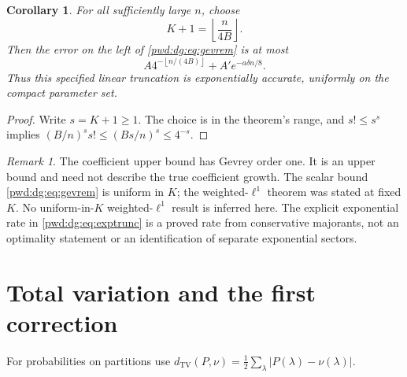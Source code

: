\documentclass[11pt,letterpaper]{article}
\numberwithin{equation}{section}
\newtheorem{corollary}[theorem]{Corollary}
\theoremstyle{remark}\newtheorem{remark}[theorem]{Remark}
\newcommand{\TV}{d_{\mathrm{TV}}}
\newcommand{\floor}[1]{\left\lfloor #1\right\rfloor}
\begin{document}
\begin{corollary}\label{pwd:dg:cor:exptrunc}
For all sufficiently large $n$, choose
\begin{equation}\label{pwd:dg:eq:Klinear}
 K+1=\floor{\frac{n}{4B}}.
\end{equation}
Then the error on the left of \eqref{pwd:dg:eq:gevrem} is at most
\begin{equation}\label{pwd:dg:eq:exptrunc}
 A4^{-\floor{n/(4B)}}+A'e^{-a\delta n/8}.
\end{equation}
Thus this specified linear truncation is exponentially accurate, uniformly on the compact parameter set.
\end{corollary}
\begin{proof}
Write $s=K+1\ge1$. The choice is in the theorem's range, and $s!\le s^s$ implies $(B/n)^ss!\le(Bs/n)^s\le4^{-s}$.
\end{proof}

\begin{remark}
The coefficient upper bound has Gevrey order one. It is an upper bound and need not describe the true coefficient growth. The scalar bound \eqref{pwd:dg:eq:gevrem} is uniform in $K$; the weighted-$\ell^1$ theorem was stated at fixed $K$. No uniform-in-$K$ weighted-$\ell^1$ result is inferred here. The explicit exponential rate in \eqref{pwd:dg:eq:exptrunc} is a proved rate from conservative majorants, not an optimality statement or an identification of separate exponential sectors.
\end{remark}

\section{Total variation and the first correction}\label{pwd:dg:sec:TV}
For probabilities on partitions use $\TV(P,\nu)=\frac12\sum_\lambda|P(\lambda)-\nu(\lambda)|$.
\end{document}
